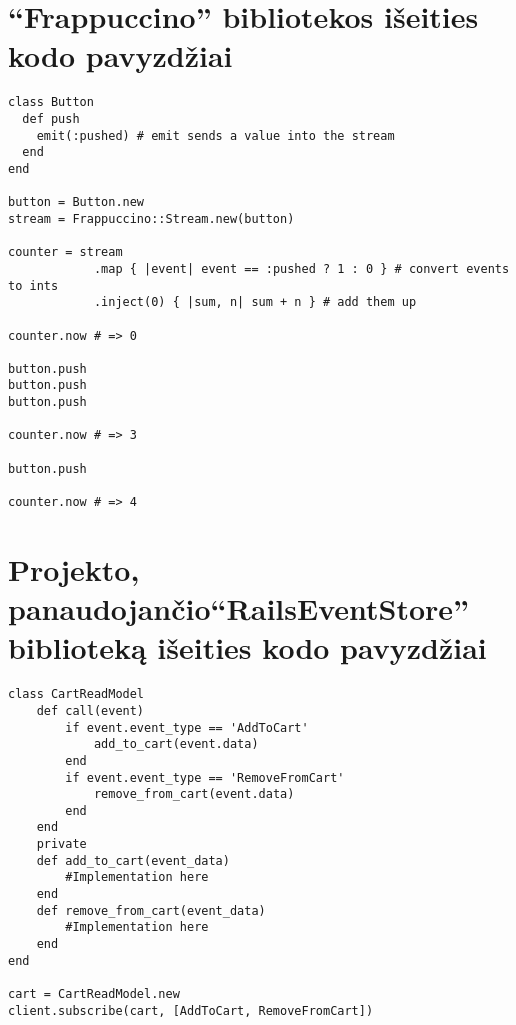 \section{``Frappuccino'' bibliotekos išeities kodo pavyzdžiai} \label{appendix_frappuccino}

\begin{lstlisting}[caption=``Frappuccino'' bibliotekos panaudojimo pavyzdys, label=frappuccino]
class Button
  def push
    emit(:pushed) # emit sends a value into the stream
  end
end

button = Button.new
stream = Frappuccino::Stream.new(button)

counter = stream
            .map { |event| event == :pushed ? 1 : 0 } # convert events to ints
            .inject(0) { |sum, n| sum + n } # add them up

counter.now # => 0

button.push
button.push
button.push

counter.now # => 3

button.push

counter.now # => 4
\end{lstlisting}

\section{Projekto, panaudojančio``RailsEventStore'' biblioteką išeities kodo pavyzdžiai} \label{appendix_rails_event_store}

\begin{lstlisting}[caption=``EventStore'' bibliotekos prenumeratorių mechanizmo panaudojimas, label=event_store_subscription]
class CartReadModel
    def call(event)
        if event.event_type == 'AddToCart'
            add_to_cart(event.data)
        end
        if event.event_type == 'RemoveFromCart'
            remove_from_cart(event.data)
        end
    end
    private
    def add_to_cart(event_data)
        #Implementation here
    end
    def remove_from_cart(event_data)
        #Implementation here
    end 
end
 
cart = CartReadModel.new
client.subscribe(cart, [AddToCart, RemoveFromCart]) 
\end{lstlisting}
